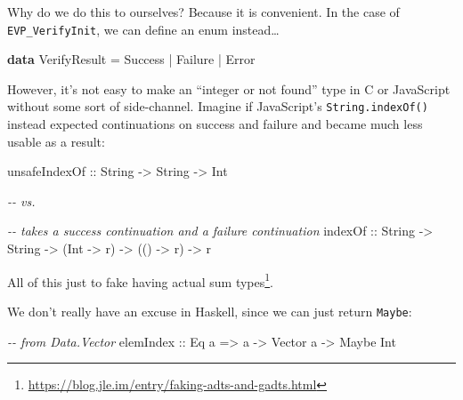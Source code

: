 \documentclass[]{article}
\newenvironment{Shaded}{}{}
\newcommand{\CommentTok}[1]{\textcolor[rgb]{0.38,0.63,0.69}{\textit{#1}}}
\newcommand{\DataTypeTok}[1]{\textcolor[rgb]{0.56,0.13,0.00}{#1}}
\newcommand{\KeywordTok}[1]{\textcolor[rgb]{0.00,0.44,0.13}{\textbf{#1}}}
\newcommand{\NormalTok}[1]{#1}
\newcommand{\OperatorTok}[1]{\textcolor[rgb]{0.40,0.40,0.40}{#1}}
\newcommand{\OtherTok}[1]{\textcolor[rgb]{0.00,0.44,0.13}{#1}}
\renewcommand{\href}[2]{#2\footnote{\url{#1}}}
\begin{document}
Why do we do this to ourselves? Because it is convenient. In the case of
\texttt{EVP\_VerifyInit}, we can define an enum instead\ldots{}

\begin{Shaded}
\begin{Highlighting}[]
\KeywordTok{data} \DataTypeTok{VerifyResult} \OtherTok{=} \DataTypeTok{Success} \OperatorTok{|} \DataTypeTok{Failure} \OperatorTok{|} \DataTypeTok{Error}
\end{Highlighting}
\end{Shaded}

However, it's not easy to make an ``integer or not found'' type in C or
JavaScript without some sort of side-channel. Imagine if JavaScript's
\texttt{String.indexOf()} instead expected continuations on success and failure
and became much less usable as a result:

\begin{Shaded}
\begin{Highlighting}[]
\OtherTok{unsafeIndexOf ::} \DataTypeTok{String} \OtherTok{{-}\textgreater{}} \DataTypeTok{String} \OtherTok{{-}\textgreater{}} \DataTypeTok{Int}

\CommentTok{{-}{-} vs.}

\CommentTok{{-}{-} takes a success continuation and a failure continuation}
\OtherTok{indexOf ::} \DataTypeTok{String} \OtherTok{{-}\textgreater{}} \DataTypeTok{String} \OtherTok{{-}\textgreater{}}\NormalTok{ (}\DataTypeTok{Int} \OtherTok{{-}\textgreater{}}\NormalTok{ r) }\OtherTok{{-}\textgreater{}}\NormalTok{ (() }\OtherTok{{-}\textgreater{}}\NormalTok{ r) }\OtherTok{{-}\textgreater{}}\NormalTok{ r}
\end{Highlighting}
\end{Shaded}

All of this just to
\href{https://blog.jle.im/entry/faking-adts-and-gadts.html}{fake having actual
sum types}.

We don't really have an excuse in Haskell, since we can just return
\texttt{Maybe}:

\begin{Shaded}
\begin{Highlighting}[]
\CommentTok{{-}{-} from Data.Vector}
\OtherTok{elemIndex ::} \DataTypeTok{Eq}\NormalTok{ a }\OtherTok{=\textgreater{}}\NormalTok{ a }\OtherTok{{-}\textgreater{}} \DataTypeTok{Vector}\NormalTok{ a }\OtherTok{{-}\textgreater{}} \DataTypeTok{Maybe} \DataTypeTok{Int}
\end{Highlighting}
\end{Shaded}
\end{document}
